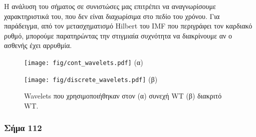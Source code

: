 \documentclass[11pt,a4paper]{article}
\begin{document}
Η ανάλυση του σήματος σε συνιστώσες μας επιτρέπει να αναγνωρίσουμε χαρακτηριστικά του, που δεν είναι διαχωρίσιμα στο πεδίο του χρόνου. Για παράδειγμα, από τον μετασχηματισμό Hilbert του IMF που περιγράφει τον καρδιακό ρυθμό, μπορούμε παρατηρώντας την στιγμιαία συχνότητα να διακρίνουμε αν ο ασθενής έχει αρρυθμία.

\begin{figure}[H]
\centering
\begin{minipage}{0.48\textwidth}
	\centering
	\texttt{[image: fig/cont\_wavelets.pdf]}
	(α)
\end{minipage}
\begin{minipage}{0.48\textwidth}
	\centering
	\texttt{[image: fig/discrete\_wavelets.pdf]}
	(β)
\end{minipage}
\vfill
\caption{Wavelets που χρησιμοποιήθηκαν στον (α) συνεχή WT (β) διακριτό WT.}
\label{fig:wavelets}
\end{figure}


\subsubsection*{Σήμα 112}
\end{document}
